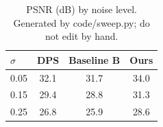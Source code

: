 \begin{table}[t]
\caption{PSNR (dB) by noise level. Generated by code/sweep.py; do not edit by hand.}
\label{tab:psnr}
\centering
\begin{tabular}{lccc}
\toprule
$\sigma$ & DPS & Baseline B & Ours \\
\midrule
0.05 & 32.1 & 31.7 & 34.0 \\
0.15 & 29.4 & 28.8 & 31.3 \\
0.25 & 26.8 & 25.9 & 28.6 \\
\bottomrule
\end{tabular}
\end{table}
